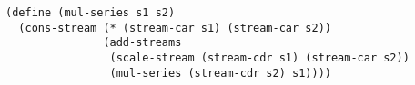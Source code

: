 \documentclass[a4paper,12pt]{article}
\begin{document}
\begin{lstlisting}
(define (mul-series s1 s2)
  (cons-stream (* (stream-car s1) (stream-car s2))
               (add-streams
                (scale-stream (stream-cdr s1) (stream-car s2))
                (mul-series (stream-cdr s2) s1))))
\end{lstlisting}
\end{document}

